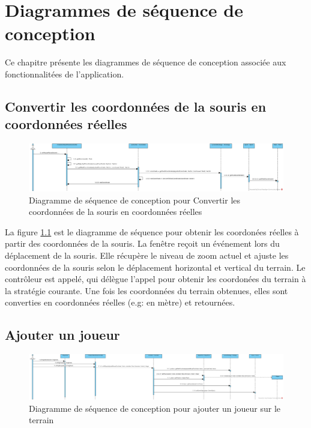 
\chapter{Diagrammes de séquence de conception}
\label{s:sequence_conception}

Ce chapitre présente les diagrammes de séquence de conception associée aux fonctionnalitées de l'application.

\section{Convertir les coordonnées de la souris en coordonnées réelles}
\label{sec:convertir_coordonnees_souris}

\begin{figure}[htpb]
    \centering
    \includegraphics[scale=0.3]{fig/dsc_get_real_coordinate.png}
    \caption{Diagramme de séquence de conception pour Convertir les coordonnées de la souris en coordonnées réelles}
    \label{fig:dsc_pixel_reel}
\end{figure}

La figure \ref{fig:dsc_pixel_reel} est le diagramme de séquence pour obtenir les coordonées réelles à partir des coordonnées de la souris.
La fenêtre reçoit un événement lors du déplacement de la souris.
Elle récupère le niveau de zoom actuel et ajuste les coordonnées de la souris selon le déplacement horizontal et vertical du terrain.
Le contrôleur est appelé, qui délègue l'appel pour obtenir les coordonées du terrain à la stratégie courante.
Une fois les coordonnées du terrain obtenues, elles sont converties en coordonnées réelles (e.g: en mètre) et retournées.


\section{Ajouter un joueur}
\label{sec:ajouter_joueur}

\begin{figure}[htpb]
    \centering
    \includegraphics[scale=0.3]{fig/dsc_create_player.png}
    \caption{Diagramme de séquence de conception pour ajouter un joueur sur le terrain}
    \label{fig:dsc_create_player}
\end{figure}


